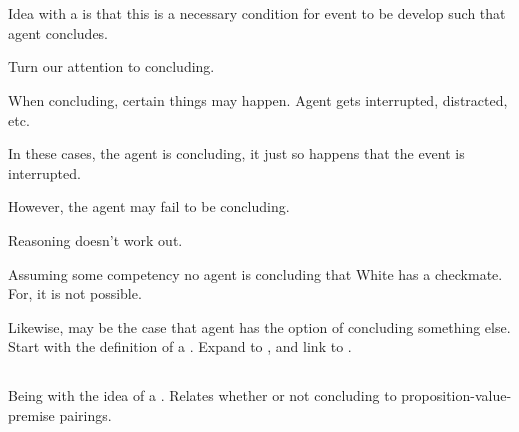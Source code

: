\chapter{}
\label{cha:zS:sec:curbs}

\begin{note}
  Idea with a \curb{} is that this is a necessary condition for event to be develop such that agent concludes.
\end{note}

\begin{note}
  Turn our attention to concluding.

  When concluding, certain things may happen.
  Agent gets interrupted, distracted, etc.

  In these cases, the agent is concluding, it just so happens that the event is interrupted.

  However, the agent may fail to be concluding.

  Reasoning doesn't work out.

  Assuming some competency no agent is concluding that White has a checkmate.
  For, it is not possible.

  Likewise, may be the case that agent has the option of concluding something else.
  Start with the definition of a \bCurb{}.
  Expand to \curb{}, and link  to .
\end{note}

\section{}
\label{sec:curb}

\begin{note}
  Being with the idea of a \curb{}.
  Relates whether or not concluding to proposition-value-premise pairings.
\end{note}

